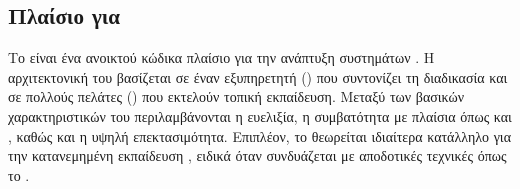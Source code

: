 \subsection{Πλαίσιο  για }

Το  είναι ένα ανοικτού κώδικα πλαίσιο για την ανάπτυξη συστημάτων  \cite{beutel2020flower}. Η αρχιτεκτονική του βασίζεται σε έναν εξυπηρετητή () που συντονίζει τη διαδικασία και σε πολλούς πελάτες () που εκτελούν τοπική εκπαίδευση. Μεταξύ των βασικών χαρακτηριστικών του περιλαμβάνονται η ευελιξία, η συμβατότητα με πλαίσια όπως  και , καθώς και η υψηλή επεκτασιμότητα. Επιπλέον, το  θεωρείται ιδιαίτερα κατάλληλο για την κατανεμημένη εκπαίδευση , ειδικά όταν συνδυάζεται με αποδοτικές τεχνικές όπως το .
